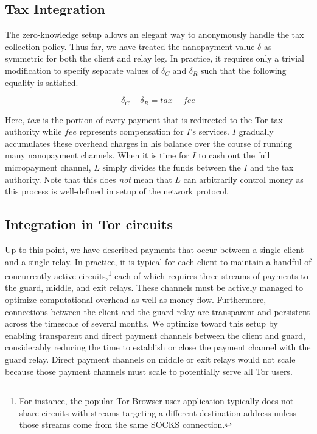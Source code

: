 \subsection{Tax Integration}

The zero-knowledge setup allows an elegant way to anonymously handle the tax collection policy.
Thus far, we have treated the nanopayment value $\delta$ as symmetric for both the client and relay leg.
In practice, it requires only a trivial modification to specify separate values of $\delta_C$ and $\delta_R$ such that the following equality is satisfied.

\begin{equation}
  \delta_C - \delta_R = \mathit{tax} + \mathit{fee}
  \label{eq:payment}
\end{equation}


\medskip \noindent Here, $\mathit{tax}$ is the portion of every payment that is redirected to the Tor tax authority while $\mathit{fee}$ represents compensation for $I$'s services.
$I$ gradually accumulates these overhead charges in his balance over the course of running many nanopayment channels.
When it is time for $I$ to cash out the full micropayment channel, $L$ simply divides the funds between the $I$ and the tax authority.
Note that this does \emph{not} mean that $L$ can arbitrarily control money as this process is well-defined in setup of the network protocol.

\subsection{Integration in Tor circuits}

Up to this point, we have described payments that occur between a single client and a single relay.
In practice, it is typical for each client to maintain a handful of concurrently active circuits,\footnote{For instance, the popular Tor Browser user application typically does not share circuits with streams targeting a different destination address unless those streams come from the same SOCKS connection.}
each of which requires three streams of payments to the guard, middle, and exit relays.
These channels must be actively managed to optimize computational overhead as well as money flow.
Furthermore, connections between the client and the guard relay are transparent and persistent across the timescale of several months.
We optimize toward this setup by enabling transparent and direct payment channels between the client and guard, considerably reducing the time to establish or close the payment channel with the guard relay.
Direct payment channels on middle or exit relays would not scale because those payment channels must scale to potentially serve all Tor users.


